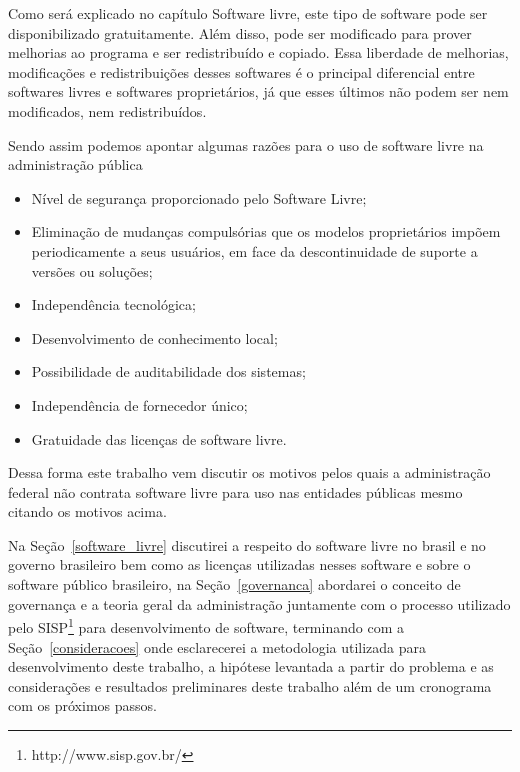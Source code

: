 Como será explicado no capítulo Software livre, este tipo de software pode ser disponibilizado
gratuitamente. Além disso, pode ser modificado para prover melhorias ao
programa e ser redistribuído e copiado. Essa liberdade de melhorias, modificações e redistribuições
desses softwares é o principal diferencial entre softwares livres e softwares proprietários, já que
esses últimos não podem ser nem modificados, nem redistribuídos.

Sendo assim podemos apontar algumas razões para o uso de software livre na administração 
pública

\begin{itemize}

\item Nível de segurança proporcionado pelo Software Livre;
\item Eliminação de mudanças compulsórias que os modelos proprietários impõem
periodicamente a seus usuários, em face da descontinuidade de suporte a
versões ou soluções; 
\item Independência tecnológica; 
\item Desenvolvimento de conhecimento local; 
\item Possibilidade de auditabilidade dos sistemas;
\item Independência de fornecedor único;
\item Gratuidade das licenças de software livre.
\end{itemize}

Dessa forma este trabalho vem discutir os motivos pelos quais a administração 
federal não contrata software livre para uso nas entidades públicas mesmo citando 
os motivos acima.

Na Seção~\ref{software_livre} discutirei a respeito do software livre no brasil e no governo 
brasileiro bem como as licenças utilizadas nesses software e sobre o software público 
brasileiro,
%
na Seção~\ref{governanca} abordarei o conceito de governança e a teoria geral
da administração juntamente com o processo utilizado pelo SISP\footnote{http://www.sisp.gov.br/}
para desenvolvimento de software,
%
terminando com a Seção~\ref{consideracoes} onde esclarecerei a metodologia utilizada para desenvolvimento
deste trabalho, a hipótese levantada a partir do problema e as considerações e resultados preliminares 
deste trabalho além de um cronograma com os próximos passos. 



